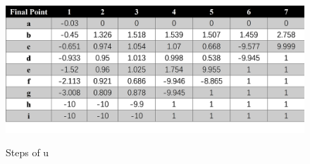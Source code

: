 \documentclass{mcmthesis}
\begin{document}
\begin{figure}[H]%
  \centering
  \caption{Steps of u}
  \includegraphics[width=50ex]{Optimal Control of a Linear Discrete System/MCM20200128/picture/changeA/表格.png} %
  \label{Fig.RNN} %
\end{figure}
\end{document}
